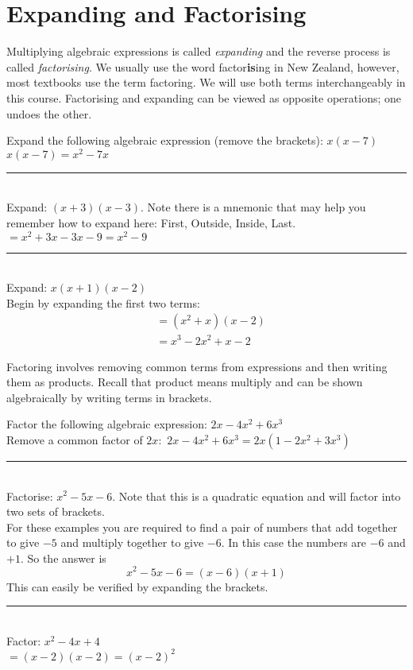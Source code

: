 \section*{Expanding and Factorising}
Multiplying algebraic expressions is called \emph{expanding} and the reverse process is called \emph{factorising}. We usually use the word factor\textbf{is}ing in New Zealand, however, most textbooks use the term factoring. We will use both terms interchangeably in this course. Factorising and expanding can be viewed as opposite operations; one undoes the other.  

\example Expand the following algebraic expression (remove the brackets): $x(x-7)$\medskip\\
\solution $x(x-7)=x^2-7x$\\
\rule{6.8cm}{0.5pt}\\
\example Expand: $(x+3)(x-3)$. Note there is a mnemonic \textbf{} that may help you remember how to expand here: First, Outside, Inside, Last.\medskip\\
\solution $=x^2+3x-3x-9=x^2-9$\\
\rule{6.8cm}{0.5pt}\\
\example Expand: $x(x+1)(x-2)$\medskip\\
\solution Begin by expanding the first two terms:
\begin{align*} &=(x^2+x)(x-2)\\
&=x^3-2x^2+x-2
\end{align*}

Factoring involves removing common terms from expressions and then writing them as products. Recall that product means multiply and can be shown algebraically by writing terms in brackets. 

\example Factor the following algebraic expression: $2x-4x^2+6x^3$\medskip\\
\solution Remove a common factor of $2x$: $\,2x-4x^2+6x^3=2x(1-2x^2+3x^3)$\\
\rule{6.8cm}{0.5pt}\\
\example Factorise: $x^{2} -5 x -6$. Note that this is a quadratic equation and will factor into two sets of brackets.\\
\solution For these examples you are required to find a pair of numbers that add together to give $ -5$ and multiply together to give $ -6$. In this case the numbers are $ -6$ and $ +1$. So the answer is
\begin{equation*}x^{2} -5 x -6 =\left (x -6\right ) \left (x +1\right )
\end{equation*}
This can easily be verified by expanding the brackets.\\
\rule{6.8cm}{0.5pt}\\
\example Factor: $x^2-4x+4$\medskip\\
\solution $=(x-2)(x-2)=(x-2)^2$
	
